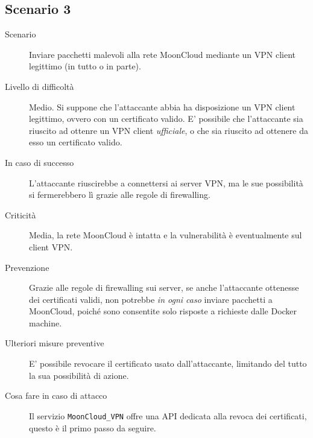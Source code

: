 \subsection{Scenario 3}
\begin{description}
    \item[Scenario]Inviare pacchetti malevoli alla rete MoonCloud
    mediante un VPN client legittimo (in tutto o in parte).
    \item[Livello di difficoltà]Medio. Si suppone che l'attaccante abbia
    ha disposizione un VPN client legittimo, ovvero con un certificato
    valido. E' possibile che l'attaccante sia riuscito ad ottenre un
    VPN client \textit{ufficiale}, o che sia riuscito ad ottenere
    da esso
    un certificato valido.
    \item[In caso di successo]L'attaccante riuscirebbe a connettersi
    ai server VPN, ma le sue possibilità si fermerebbero lì grazie
    alle regole di firewalling.
    \item[Criticità]Media, la rete MoonCloud è intatta e la vulnerabilità
    è eventualmente sul client VPN.
    \item[Prevenzione]Grazie alle regole di firewalling sui server,
    se anche l'attaccante ottenesse dei certificati validi, non
    potrebbe \textit{in ogni caso} inviare pacchetti a MoonCloud, poiché
    sono consentite solo risposte a richieste dalle Docker machine. 
    \item[Ulteriori misure preventive]E' possibile revocare il certificato
    usato dall'attaccante, limitando del tutto la sua possibilità di azione.
    \item[Cosa fare in caso di attacco]Il servizio  \texttt{MoonCloud\_VPN}
    offre una API dedicata alla revoca dei certificati, questo è il primo
    passo da seguire.
\end{description}


